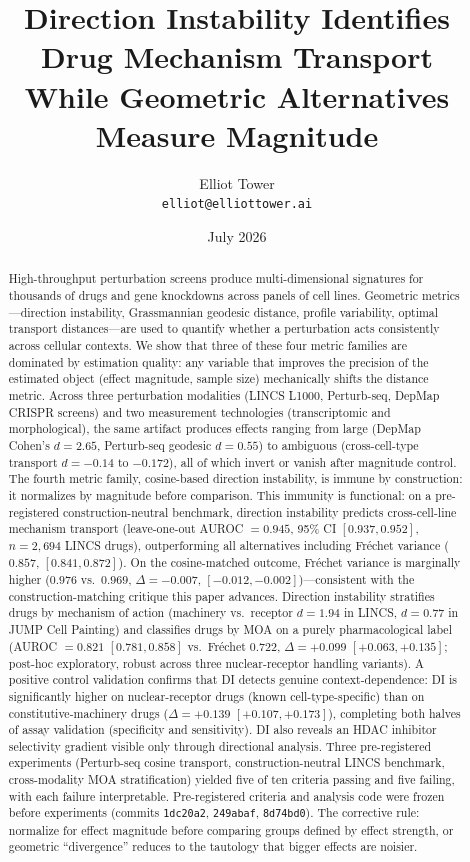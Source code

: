 \documentclass[11pt]{article}
\title{Direction Instability Identifies Drug Mechanism Transport\\
While Geometric Alternatives Measure Magnitude}
\author{Elliot Tower\\
\texttt{elliot@elliottower.ai}}
\date{July 2026}
\begin{document}
\maketitle

\begin{abstract}
High-throughput perturbation screens produce multi-dimensional signatures
for thousands of drugs and gene knockdowns across panels of cell lines.
Geometric metrics---direction instability, Grassmannian geodesic
distance, profile variability, optimal transport distances---are used to
quantify whether a perturbation acts consistently across cellular
contexts. We show that three of these four metric families are dominated
by estimation quality: any variable that improves the precision of the
estimated object (effect magnitude, sample size) mechanically shifts the
distance metric. Across three perturbation modalities (LINCS L1000,
Perturb-seq, DepMap CRISPR screens) and two measurement technologies
(transcriptomic and morphological), the same artifact produces effects ranging from large (DepMap Cohen's
$d = 2.65$, Perturb-seq geodesic $d = 0.55$) to ambiguous
(cross-cell-type transport $d = -0.14$ to $-0.172$), all of which
invert or vanish after magnitude control. The fourth metric family,
cosine-based direction instability, is immune by construction: it
normalizes by magnitude before comparison. This immunity is functional:
on a pre-registered construction-neutral benchmark, direction instability
predicts cross-cell-line mechanism transport (leave-one-out AUROC $=
0.945$, 95\% CI $[0.937, 0.952]$, $n = 2{,}694$ LINCS drugs),
outperforming all alternatives including Fr\'{e}chet variance ($0.857$,
$[0.841, 0.872]$). On the cosine-matched outcome, Fr\'{e}chet variance
is marginally higher ($0.976$ vs.\ $0.969$, $\Delta = -0.007$, $[-0.012,
-0.002]$)---consistent with the construction-matching critique this paper
advances. Direction instability stratifies drugs by mechanism of action
(machinery vs.\ receptor $d = 1.94$ in LINCS, $d = 0.77$ in JUMP Cell
Painting) and classifies drugs by MOA on a purely pharmacological label
(AUROC $= 0.821$ $[0.781, 0.858]$ vs.\ Fr\'{e}chet $0.722$, $\Delta =
+0.099$ $[+0.063, +0.135]$; post-hoc exploratory, robust across three
nuclear-receptor handling variants). A positive control validation
confirms that DI detects genuine context-dependence: DI is significantly
higher on nuclear-receptor drugs (known cell-type-specific) than on
constitutive-machinery drugs ($\Delta = +0.139$ $[+0.107, +0.173]$),
completing both halves of assay validation (specificity and sensitivity).
DI also reveals an HDAC inhibitor
selectivity gradient visible only through directional analysis. Three pre-registered experiments
(Perturb-seq cosine transport, construction-neutral LINCS benchmark,
cross-modality MOA stratification) yielded five of ten criteria passing
and five failing, with each failure interpretable. Pre-registered
criteria and analysis code were frozen before experiments (commits
\texttt{1dc20a2}, \texttt{249abaf}, \texttt{8d74bd0}). The corrective
rule: normalize for effect magnitude before comparing groups defined by
effect strength, or geometric ``divergence'' reduces to the tautology
that bigger effects are noisier.
\end{abstract}
\end{document}
